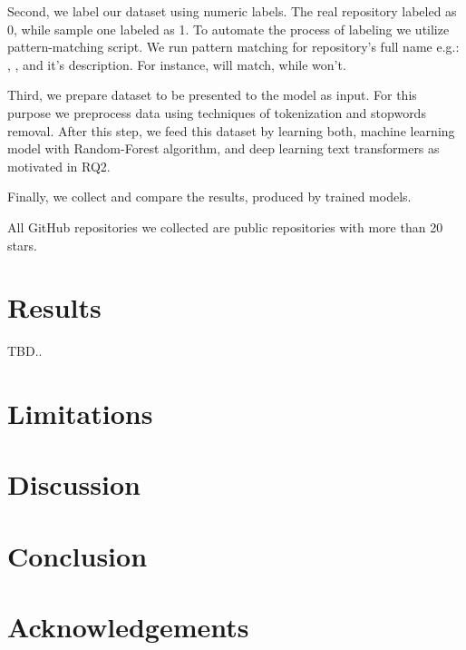\documentclass[sigplan,nonacm,review]{acmart}
\begin{document}
Second, we label our dataset using numeric labels. The real repository labeled
as 0, while sample one labeled as 1. To automate the process of labeling we
utilize pattern-matching script. We run pattern matching for repository's full
name e.g.: , , and it's description. For
instance,  will match, while
 won't.

Third, we prepare dataset to be presented to the model as input. For this
purpose we preprocess data using techniques of tokenization and stopwords
removal. After this step, we feed this dataset by learning both, machine
learning model with Random-Forest algorithm, and deep learning text
transformers as motivated in RQ2.

Finally, we collect and compare the results, produced by trained models.

All GitHub repositories we collected are public repositories with more than
20 stars.


\section{Results}\label{sec:results}
TBD..

\section{Limitations}\label{sec:limitations}


\section{Discussion}\label{sec:discussion}


\section{Conclusion}\label{sec:conclusion}


\section{Acknowledgements}\label{sec:acks}

{\raggedright

}
\vfill\eject
\end{document}
